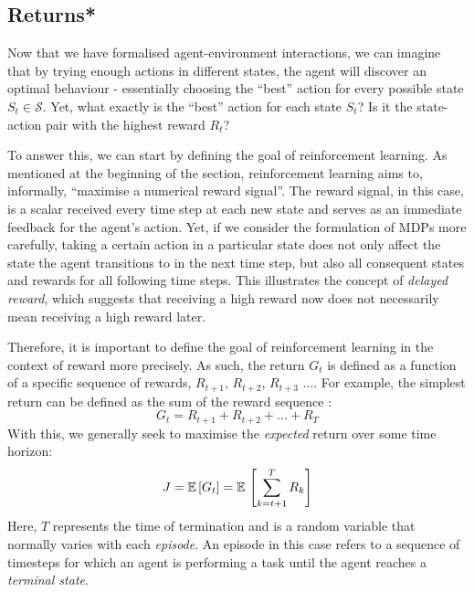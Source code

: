 \subsection{Returns*}
\label{subsec:2_returns}

Now that we have formalised agent-environment interactions, we can imagine that by trying enough actions in different states, the agent will discover an optimal behaviour - essentially choosing the ``best'' action for every possible state $S_t \in \mathcal{S}$. Yet, what exactly is the ``best'' action for each state $S_t$? Is it the state-action pair with the highest reward $R_t$? 

To answer this, we can start by defining the goal of reinforcement learning. As mentioned at the beginning of the section, reinforcement learning aims to, informally, “maximise a numerical reward signal”. The reward signal, in this case, is a scalar received every time step at each new state and serves as an immediate feedback for the agent's action. Yet, if we consider the formulation of MDPs more carefully, taking a certain action in a particular state does not only affect the state the agent transitions to in the next time step, but also all consequent states and rewards for all following time steps. This illustrates the concept of \textit{delayed reward}, which suggests that receiving a high reward now does not necessarily mean receiving a high reward later.

Therefore, it is important to define the goal of reinforcement learning in the context of reward more precisely. As such, the return $G_t$ is defined as a function of a specific sequence of rewards, $R_{t+1}$, $R_{t+2}$, $R_{t+3}$ .... For example, the simplest return can be defined as the sum of the reward sequence \cite{suttonAndBartoBook}:
\begin{equation}
    G_t = R_{t+1} + R_{t+2} + ... + R_{T}
\end{equation}
With this, we generally seek to maximise the \textit{expected} return over some time horizon:
\begin{equation}
    J = \mathbb{E} \, [G_t] = \mathbb{E} \, \left[ 
    \sum^{T}_{k = t+1} R_k
    \right]
\end{equation}
Here, $T$ represents the time of termination and is a random variable that normally varies with each \textit{episode}. An episode in this case refers to a sequence of timesteps for which an agent is performing a task until the agent reaches a \textit{terminal state}. 

